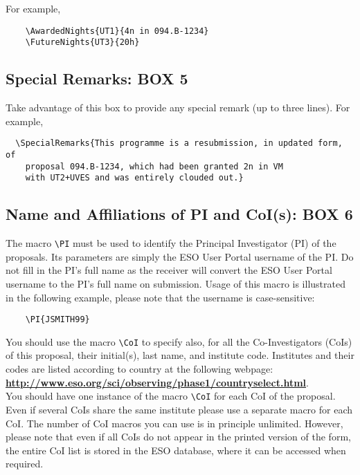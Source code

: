 \documentclass{article}
\begin{document}
For example,
\begin{verbatim}
    \AwardedNights{UT1}{4n in 094.B-1234}
    \FutureNights{UT3}{20h}
\end{verbatim} 

\subsection{Special Remarks:  {\bf BOX 5}}

Take advantage of this box to provide any special remark (up to three
lines).  For example,
\begin{verbatim}
  \SpecialRemarks{This programme is a resubmission, in updated form, of
    proposal 094.B-1234, which had been granted 2n in VM
    with UT2+UVES and was entirely clouded out.}
\end{verbatim}

\subsection{Name and Affiliations of PI and CoI(s): {\bf BOX 6}}

The macro \verb|\PI| must be used to identify the Principal
Investigator (PI) of the proposals. Its parameters are simply the 
ESO User Portal username of the PI. Do not fill in the PI's full
name as the receiver will convert the ESO User Portal username
to the PI's full name on submission.
Usage of this macro is illustrated in the following example, please note that the username is case-sensitive:
\begin{verbatim}
    \PI{JSMITH99}
\end{verbatim}

You should use the macro \verb|\CoI| to specify also, for
all the Co-Investigators (CoIs) of this proposal, their initial(s),
last name, and institute code. Institutes and their codes are listed 
according to country at the following webpage:\\
\href{http://www.eso.org/sci/observing/phase1/countryselect.html}
{\bf\underline{http://www.eso.org/sci/observing/phase1/countryselect.html}}.\\
You should have one instance of the macro \verb|\CoI| for each CoI of the
proposal. Even if several CoIs share the same institute
please use a separate macro for each CoI. The number of CoI macros you can 
use is in principle unlimited. However, please note that 
even if all CoIs do not appear in the printed version of the form,
the entire  CoI list is stored in the ESO database, where it
can be accessed when required.
\end{document}
